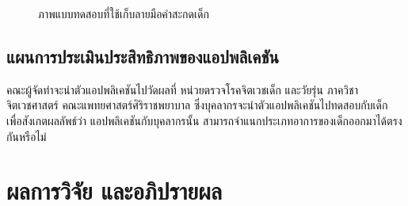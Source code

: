 \documentclass[12pt,oneside,openright,a4paper]{cpe-thai-project}
\begin{document}
\begin{figure}[!ht]\centering
  \setlength{\fboxrule}{0.2mm} %
  \setlength{\fboxsep}{1cm}
  \caption{ภาพแบบทดสอบที่ใช้เก็บลายมือคำสะกดเด็ก}\label{fig:system}
    
\end{figure}
\newpage

\section{แผนการประเมินประสิทธิภาพของแอปพลิเคชัน}
คณะผู้จัดทำจะนำตัวแอปพลิเคชันไปวัดผลที่ หน่วยตรวจโรคจิตเวชเด็ก และวัยรุ่น ภาควิชาจิตเวชศาสตร์ คณะแพทยศาสตร์ศิริราชพยาบาล  ซึ่งบุคลากรจะนำตัวแอปพลิเคชันไปทดสอบกับเด็ก เพื่อสังเกตผลลัพธ์ว่า แอปพลิเคชันกับบุคลากรนั้น สามารถจำแนกประเภทอาการของเด็กออกมาได้ตรงกันหรือไม่ 

\chapter{ผลการวิจัย และอภิปรายผล}
\end{document}
